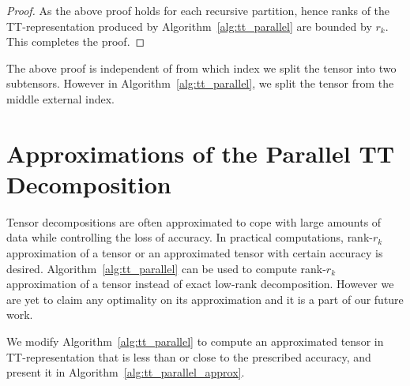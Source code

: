 \documentclass[sigconf]{acmart}
\begin{document}
\begin{proof}
	\noindent As the above proof holds for each recursive partition, hence  ranks of the TT-representation produced by Algorithm~\ref{alg:tt_parallel} are bounded by $r_k$. This completes the proof.
\end{proof}

\indent The above proof is independent of from which index we split the tensor into two subtensors. However in Algorithm~\ref{alg:tt_parallel}, we split the tensor from the middle external index.


\section{Approximations of the Parallel TT Decomposition}
\label{sec:approaches}
Tensor decompositions are often approximated to cope with large amounts of data while controlling the loss of accuracy. In practical computations, rank-$r_k$ approximation of a tensor or an approximated tensor with certain accuracy is desired. Algorithm~\ref{alg:tt_parallel} can be used to compute rank-$r_k$ approximation of a tensor instead of exact low-rank decomposition. However we are yet to claim any optimality on its approximation and it is a part of our future work.

We modify Algorithm~\ref{alg:tt_parallel} to compute an approximated tensor in TT-representation that is less than or close to the prescribed accuracy, and present it in Algorithm~\ref{alg:tt_parallel_approx}.
\end{document}

